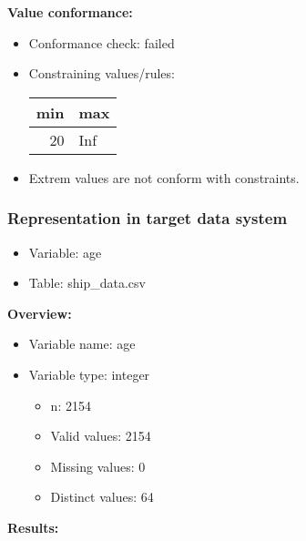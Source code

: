 \documentclass[
]{article}
\providecommand{\tightlist}{%
  \setlength{\itemsep}{0pt}\setlength{\parskip}{0pt}}
\begin{document}
\textbf{Value conformance:}

\begin{itemize}
\tightlist
\item
  Conformance check: failed
\item
  Constraining values/rules:

  \begin{table}[H]
  \centering
  \begin{tabular}{r|l}
  \hline
  \textbf{min} & \textbf{max}\\
  \hline
  20 & Inf\\
  \hline
  \end{tabular}
  \end{table}
\item
  Extrem values are not conform with constraints.
\end{itemize}

\newpage

\hypertarget{representation-in-target-data-system}{%
\subsubsection{\texorpdfstring{Representation in \textbf{target} data
system}{Representation in target data system}}\label{representation-in-target-data-system}}

\begin{itemize}
\tightlist
\item
  Variable: age
\item
  Table: ship\_data.csv
\end{itemize}

\textbf{Overview:}

\begin{itemize}
\tightlist
\item
  Variable name: age
\item
  Variable type: integer

  \begin{itemize}
  \tightlist
  \item
    n: 2154
  \item
    Valid values: 2154
  \item
    Missing values: 0
  \item
    Distinct values: 64
  \end{itemize}
\end{itemize}

\textbf{Results:}\\
\end{document}
